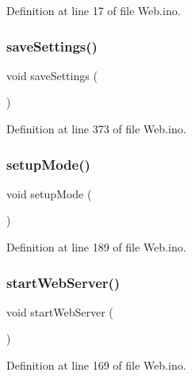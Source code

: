 Definition at line 17 of file Web.\+ino.

\mbox{\label{_web_8ino_ac7142ee2baa705d2dd402769467d5a4e}} 
\subsubsection{\texorpdfstring{saveSettings()}{saveSettings()}}
{\footnotesize\ttfamily void save\+Settings (\begin{DoxyParamCaption}{ }\end{DoxyParamCaption})}



Definition at line 373 of file Web.\+ino.

\mbox{\label{_web_8ino_a292bc11fc3dcd09074ef62051f881173}} 
\subsubsection{\texorpdfstring{setupMode()}{setupMode()}}
{\footnotesize\ttfamily void setup\+Mode (\begin{DoxyParamCaption}{ }\end{DoxyParamCaption})}



Definition at line 189 of file Web.\+ino.

\mbox{\label{_web_8ino_a0d04c1af31c2cdcf510d08e8a6643fa9}} 
\subsubsection{\texorpdfstring{startWebServer()}{startWebServer()}}
{\footnotesize\ttfamily void start\+Web\+Server (\begin{DoxyParamCaption}{ }\end{DoxyParamCaption})}



Definition at line 169 of file Web.\+ino.

\mbox{\label{_web_8ino_a229909254c88e9d103199da59b22bdd0}} 
